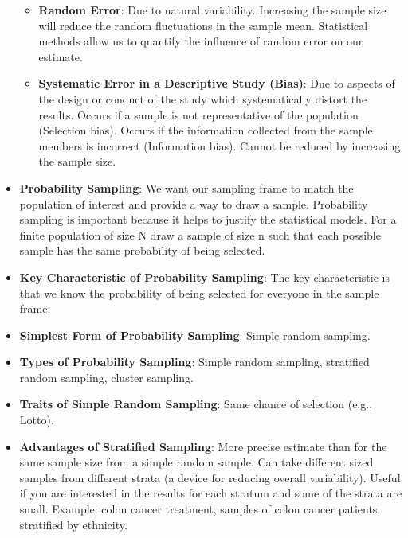 \documentclass[12pt]{article}
\begin{document}
\begin{itemize}

    \begin{itemize}
    \item \textbf{Random Error}: Due to natural variability. Increasing the sample size will reduce the random fluctuations in the sample mean. Statistical methods allow us to quantify the influence of random error on our estimate.
    \item \textbf{Systematic Error in a Descriptive Study (Bias)}: Due to aspects of the design or conduct of the study which systematically distort the results. Occurs if a sample is not representative of the population (Selection bias). Occurs if the information collected from the sample members is incorrect (Information bias). Cannot be reduced by increasing the sample size.
    \end{itemize}
\item \textbf{Probability Sampling}: We want our sampling frame to match the population of interest and provide a way to draw a sample. Probability sampling is important because it helps to justify the statistical models. For a finite population of size N draw a sample of size n such that each possible sample has the same probability of being selected.
\item \textbf{Key Characteristic of Probability Sampling}: The key characteristic is that we know the probability of being selected for everyone in the sample frame.
\item \textbf{Simplest Form of Probability Sampling}: Simple random sampling.
\item \textbf{Types of Probability Sampling}: Simple random sampling, stratified random sampling, cluster sampling.
\item \textbf{Traits of Simple Random Sampling}: Same chance of selection (e.g., Lotto).
\item \textbf{Advantages of Stratified Sampling}: More precise estimate than for the same sample size from a simple random sample. Can take different sized samples from different strata (a device for reducing overall variability). Useful if you are interested in the results for each stratum and some of the strata are small. Example: colon cancer treatment, samples of colon cancer patients, stratified by ethnicity.

\end{itemize}
\end{document}
